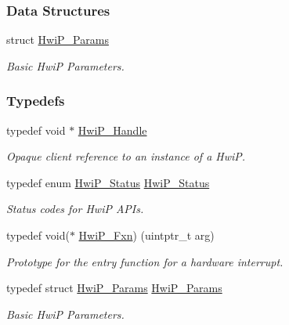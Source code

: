 \subsubsection*{Data Structures}
\begin{DoxyCompactItemize}
\item 
struct \hyperlink{struct_hwi_p___params}{Hwi\+P\+\_\+\+Params}
\begin{DoxyCompactList}\small\item\em Basic Hwi\+P Parameters. \end{DoxyCompactList}\end{DoxyCompactItemize}
\subsubsection*{Typedefs}
\begin{DoxyCompactItemize}
\item 
typedef void $\ast$ \hyperlink{_hwi_p_8h_a7dd325ff62af296374efc6d317f5e368}{Hwi\+P\+\_\+\+Handle}
\begin{DoxyCompactList}\small\item\em Opaque client reference to an instance of a Hwi\+P. \end{DoxyCompactList}\item 
typedef enum \hyperlink{_hwi_p_8h_a8f508a9a62c31a942ffc9438f53dd258}{Hwi\+P\+\_\+\+Status} \hyperlink{_hwi_p_8h_a1d0a42f3a5bb047cf6a14413f2a58e9f}{Hwi\+P\+\_\+\+Status}
\begin{DoxyCompactList}\small\item\em Status codes for Hwi\+P A\+P\+Is. \end{DoxyCompactList}\item 
typedef void($\ast$ \hyperlink{_hwi_p_8h_a53a36fe33e22847927ceddbb63fb50c7}{Hwi\+P\+\_\+\+Fxn}) (uintptr\+\_\+t arg)
\begin{DoxyCompactList}\small\item\em Prototype for the entry function for a hardware interrupt. \end{DoxyCompactList}\item 
typedef struct \hyperlink{struct_hwi_p___params}{Hwi\+P\+\_\+\+Params} \hyperlink{_hwi_p_8h_a7eefe35fc4269b78348f74e5db9c4dca}{Hwi\+P\+\_\+\+Params}
\begin{DoxyCompactList}\small\item\em Basic Hwi\+P Parameters. \end{DoxyCompactList}\end{DoxyCompactItemize}
